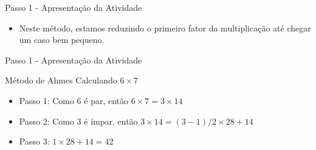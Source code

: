 \documentclass{beamer}
\begin{document}
\begin{frame}{Passo 1 - Apresentação da Atividade}

\begin{itemize}
    
    
    \begin{block}{Método de Ahmes}
    O produto de dois números $a$ e $b$, denotado por $a \times b$, pode ser calculado pelas seguintes regras:
    
    \begin{enumerate}
        \item Se $a = 1$, $a \times b = b$.
        \item Se $a$ é par então $a \times b = (a/2) \times (2b)$.
        \item Se $a$ é ímpar maior que 1 então $a \times b = ((a-1)/2) \times (2b) + b$.
        
    \end{enumerate}
    
    \end{block}
    
    \item Neste método, estamos reduzindo o primeiro fator da multiplicação até chegar um caso bem pequeno.
    
\end{itemize}
    
    
\end{frame}


\begin{frame}{Passo 1 - Apresentação da Atividade}


    \begin{block}{Método de Ahmes}
    Calculando $6 \times 7$
    
    \begin{itemize}
        \item Passo 1: Como 6 é par, então $6 \times 7 = 3 \times 14$
        \item Passo 2: Como 3 é ímpar, então $3 \times 14 =  (3-1)/2 \times 28 + 14$
        \item Passo 3: $1 \times 28 + 14 = 42$
    \end{itemize}
    
    \end{block}
\end{frame}
\end{document}
